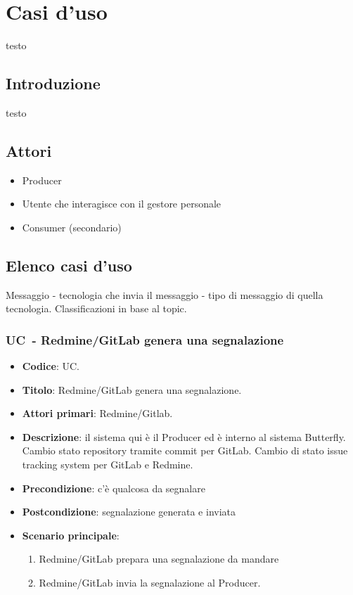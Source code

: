 \newpage
\section{Casi d'uso}
testo

	\subsection{Introduzione}
	testo
	
	\subsection{Attori}
	\begin{itemize}
		\item Producer
		\item Utente che interagisce con il gestore personale
		\item Consumer (secondario)
	\end{itemize}
	
	\subsection{Elenco casi d'uso}
	Messaggio - tecnologia che invia il messaggio - tipo di messaggio di quella tecnologia.
	Classificazioni in base al topic.




\subsubsection{UC\theuccount\ - Redmine/GitLab genera una segnalazione}
	\begin{itemize}
		\item \textbf{Codice}: UC\theuccount.
		\item \textbf{Titolo}: Redmine/GitLab genera una segnalazione.
		\item \textbf{Attori primari}: Redmine/Gitlab.
		\item \textbf{Descrizione}:
		 il sistema qui è il Producer ed è interno al sistema Butterfly. Cambio stato repository tramite commit per GitLab. Cambio di stato issue tracking system per GitLab e Redmine.
		\item \textbf{Precondizione}: c'è qualcosa da segnalare
		\item \textbf{Postcondizione}: segnalazione generata e inviata
		\item \textbf{Scenario principale}: 
		\begin{enumerate}
			\item Redmine/GitLab prepara una segnalazione da mandare
			\item Redmine/GitLab invia la segnalazione al Producer.
		\end{enumerate}
		
	\end{itemize}

